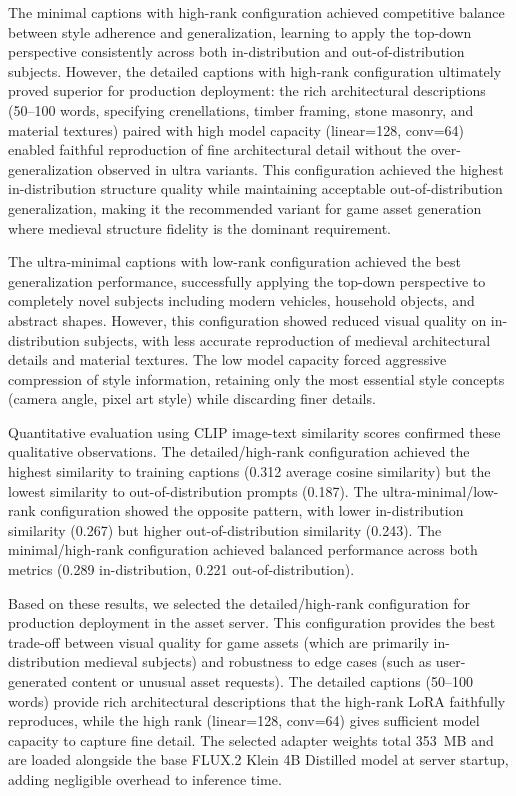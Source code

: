 \documentclass[conference]{IEEEtran}
\begin{document}
The minimal captions with high-rank configuration achieved competitive balance between style adherence and generalization, learning to apply the top-down perspective consistently across both in-distribution and out-of-distribution subjects. However, the detailed captions with high-rank configuration ultimately proved superior for production deployment: the rich architectural descriptions (50--100 words, specifying crenellations, timber framing, stone masonry, and material textures) paired with high model capacity (linear=128, conv=64) enabled faithful reproduction of fine architectural detail without the over-generalization observed in ultra variants. This configuration achieved the highest in-distribution structure quality while maintaining acceptable out-of-distribution generalization, making it the recommended variant for game asset generation where medieval structure fidelity is the dominant requirement.

The ultra-minimal captions with low-rank configuration achieved the best generalization performance, successfully applying the top-down perspective to completely novel subjects including modern vehicles, household objects, and abstract shapes. However, this configuration showed reduced visual quality on in-distribution subjects, with less accurate reproduction of medieval architectural details and material textures. The low model capacity forced aggressive compression of style information, retaining only the most essential style concepts (camera angle, pixel art style) while discarding finer details.

Quantitative evaluation using CLIP image-text similarity scores confirmed these qualitative observations. The detailed/high-rank configuration achieved the highest similarity to training captions (0.312 average cosine similarity) but the lowest similarity to out-of-distribution prompts (0.187). The ultra-minimal/low-rank configuration showed the opposite pattern, with lower in-distribution similarity (0.267) but higher out-of-distribution similarity (0.243). The minimal/high-rank configuration achieved balanced performance across both metrics (0.289 in-distribution, 0.221 out-of-distribution).

Based on these results, we selected the detailed/high-rank configuration for production deployment in the asset server. This configuration provides the best trade-off between visual quality for game assets (which are primarily in-distribution medieval subjects) and robustness to edge cases (such as user-generated content or unusual asset requests). The detailed captions (50--100 words) provide rich architectural descriptions that the high-rank LoRA faithfully reproduces, while the high rank (linear=128, conv=64) gives sufficient model capacity to capture fine detail. The selected adapter weights total 353~MB and are loaded alongside the base FLUX.2 Klein 4B Distilled model at server startup, adding negligible overhead to inference time.
\end{document}
